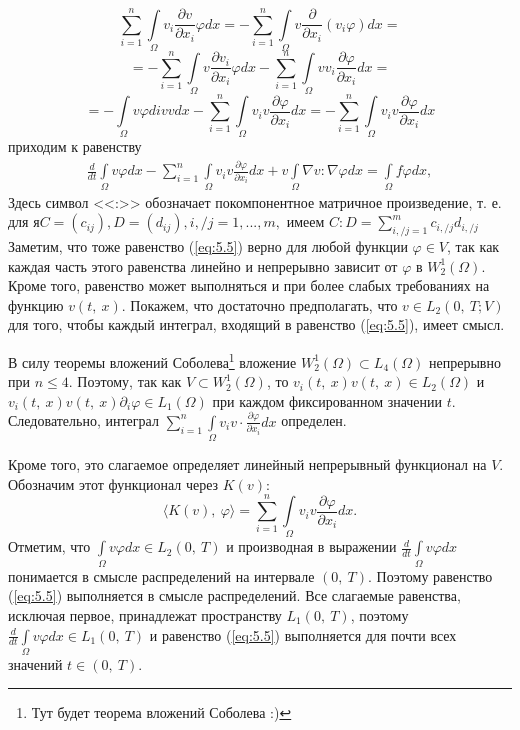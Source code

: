 $$\sum_{i=1}^{n}\int\limits_\Omega v_i\frac{\partial v}{\partial x_i}\varphi dx=-\sum_{i=1}^{n}\int\limits_\Omega v\frac{\partial}{\partial x_i}(v_i\varphi)dx=$$
$$=-\sum_{i=1}^{n}\int\limits_\Omega v\frac{\partial v_i}{\partial x_i}\varphi dx-\sum_{i=1}^{n}\int\limits_\Omega vv_i\frac{\partial\varphi}{\partial x_i} dx=$$
$$=-\int\limits_\Omega v\varphi div v dx-\sum_{i=1}^{n}\int\limits_\Omega v_i v\frac{\partial\varphi}{\partial x_i}dx=
-\sum_{i=1}^{n}\int\limits_\Omega v_i v\frac{\partial\varphi}{\partial x_i}dx$$
приходим к равенству
\begin{equation}\label{eq:5.5}
    \begin{gathered}
        \frac{d}{dt}\int\limits_\Omega v \varphi dx-\sum_{i=1}^{n}\int\limits_\Omega v_i v
        \frac{\partial \varphi }{\partial x_i}dx + v\int\limits_\Omega \nabla v :\nabla\varphi dx
        =\int\limits_\Omega f\varphi dx,
    \end{gathered}
\end{equation}
Здесь символ <<:>> обозначает покомпонентное матричное произведение, т. е. для $я C=(c_{ij}), D=(d_{ij}), i, / j=1,...,m,$ имеем $C:D=\sum_{i, / j=1}^{m} c_{i, / j}d_{i, / j}$
Заметим, что тоже равенство (\ref{eq:5.5}) верно для любой функции $\varphi\in V$, так как каждая часть этого равенства линейно и непрерывно зависит от
$\varphi$ в $W^{1}_{2}(\Omega)$. Кроме того, равенство может выполняться и при более слабых требованиях на функцию $v(t, \ x)$.
Покажем, что достаточно предполагать, что $v\in L_2(0, \ T;V)$ для того, чтобы каждый интеграл, входящий в равенство (\ref{eq:5.5}), имеет смысл.

В силу теоремы вложений Соболева\footnote{Тут будет теорема вложений Соболева :)} вложение $W^{1}_{2}(\Omega)\subset L_4(\Omega)$ непрерывно при $n \leqslant 4$.
Поэтому, так как $V\subset W^{1}_{2}(\Omega)$, то $v_i(t, \ x)v(t, \ x)\in L_2(\Omega)$ и $v_i(t, \ x)v(t, \ x)\partial_i\varphi \in L_1(\Omega)$
при каждом фиксированном значении $t$. Следовательно, интеграл $\sum_{i=1}^{n}\int\limits_\Omega v_iv\cdot\frac{\partial\varphi}{\partial x_i}dx$ определен.

Кроме того, это слагаемое определяет линейный непрерывный функционал на $V$. Обозначим этот функционал через $K(v)$:
$$\langle K(v), \ \varphi \rangle = \sum_{i=1}^{n}\int\limits_\Omega v_i v \frac{\partial \varphi}{\partial x_i}dx.$$
Отметим, что $\int\limits_\Omega v \varphi dx\in L_2(0, \ T)$ и производная в выражении \linebreak
$\frac{d}{dt}\int\limits_\Omega v \varphi dx$
понимается в смысле распределений на интервале $(0, \ T)$. Поэтому равенство (\ref{eq:5.5}) выполняется в смысле распределений.
Все слагаемые равенства, исключая первое, принадлежат пространству $L_1(0, \ T)$, поэтому $\frac{d}{dt}\int\limits_\Omega v \varphi dx\in L_1(0, \ T)$
и равенство (\ref{eq:5.5}) выполняется для почти всех значений $t\in (0, \ T)$.

